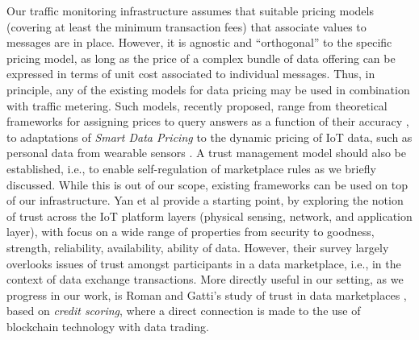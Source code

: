 \documentclass[chi_draft]{sigchi}
\begin{document}
{Our traffic monitoring infrastructure assumes that suitable pricing models (covering at least the minimum transaction fees) that associate values to messages are in place.
However, it is agnostic and ``orthogonal'' to the specific pricing model, as long as the price of a complex bundle of data offering can be expressed in terms of unit cost associated to individual messages. 
Thus, in principle, any of the existing models for data pricing may be used in combination with traffic metering. Such models, recently proposed, range from theoretical frameworks for assigning prices to query answers as a function of their accuracy \cite{Li:2014:TPP:2691190.2691191}, to adaptations of \textit{Smart Data Pricing} \cite{Sen:2015:SDP:2847579.2756543} to the dynamic pricing of IoT data, such as personal data from wearable sensors \cite{7437020}.
%
A trust management model should also be established, i.e., to enable self-regulation of marketplace rules as we briefly discussed.
While this is out of our scope, existing frameworks can be used on top of our infrastructure.
Yan et al \cite{Yan2014a} provide a starting point, by exploring the notion of trust across the IoT platform layers (physical sensing, network, and application layer), with focus on a wide range of properties from security to goodness, strength, reliability, availability, ability of data. However, their survey largely overlooks issues of trust amongst participants in a data marketplace, i.e., in the context of data exchange transactions.
%
More directly useful in our setting, as we progress in our work, is Roman and Gatti's study of trust in data marketplaces \cite{7573695}, based on \textit{credit scoring}, where a direct connection is made to the use of blockchain technology with data trading.
%

}
\end{document}
